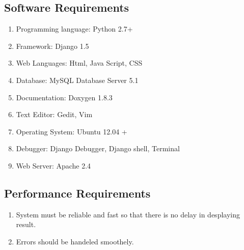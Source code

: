 \subsection{Software Requirements}
\begin{enumerate} 
    \item Programming language: Python 2.7+
    \item Framework: Django 1.5
    \item Web Languages: Html, Java Script, CSS 
    \item Database: MySQL Database Server 5.1 
    \item Documentation: Doxygen 1.8.3
    \item Text Editor: Gedit, Vim
    \item Operating System: Ubuntu 12.04 +
    \item Debugger: Django Debugger, Django shell, Terminal
    \item Web Server: Apache 2.4
\end{enumerate}
\subsection{Performance Requirements}
\begin{enumerate}
    \item System must be reliable and fast so that there is no delay in
        desplaying result.
    \item Errors should be handeled smoothely.
\end{enumerate}

